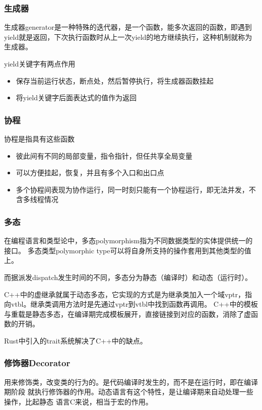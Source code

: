 \subsubsection{生成器}
生成器generator是一种特殊的迭代器，是一个函数，能多次返回的函数，即遇到yield就是返回，下次执行函数时从上一次yield的地方继续执行，这种机制就称为生成器。

yield关键字有两点作用
\begin{itemize}
    \item {保存当前运行状态，断点处，然后暂停执行，将生成器函数挂起}
    \item {将yield关键字后面表达式的值作为返回}
\end{itemize}

\subsubsection{协程}
协程是指具有这些函数
\begin{itemize}
    \item {彼此间有不同的局部变量，指令指针，但任共享全局变量}
    \item {可以方便挂起，恢复，并且有多个入口和出口点}
    \item {多个协程间表现为协作运行，同一时刻只能有一个协程运行，即无法并发，不含多线程情况}
\end{itemize}

\subsubsection{多态}
在编程语言和类型论中，多态polymorphism指为不同数据类型的实体提供统一的接口。
多态类型polymorphic type可以将自身所支持的操作套用到其他类型的值上。

而据派发dispatch发生时间的不同，多态分为静态（编译时）和动态（运行时）。

C++中的虚继承就属于动态多态，它实现的方式是为继承类加入一个域vptr，指向vtbl。继承类调用方法时是先通过vptr到vtbl中找到函数再调用。
C++中的模板与重载是静态多态，在编译期完成模板展开，直接链接到对应的函数，消除了虚函数的开销。

Rust中引入的trait系统解决了C++中的缺点。

\subsubsection{修饰器Decorator}
用来修饰类，改变类的行为的。是代码编译时发生的，而不是在运行时，即在编译期阶段
就执行修饰器的作用。动态语言有这个特性，是让编译期来自动处理一些操作，比起静态
语言C来说，相当于宏的作用。

